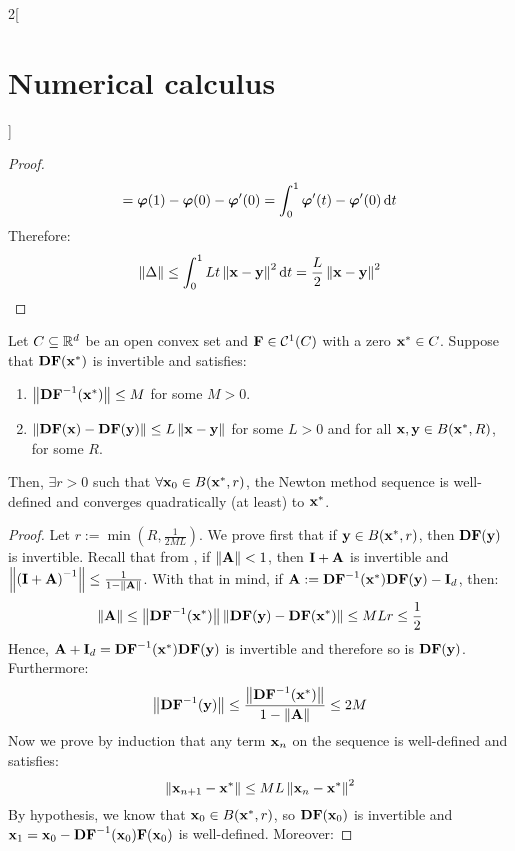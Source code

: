 \documentclass[../../../main_math.tex]{subfiles}
\begin{document}
\begin{multicols}{2}[\section{Numerical calculus}]
\begin{proof}
\begin{multline*}
      =\vf\varphi(1)-\vf\varphi(0)-\vf\varphi'(0)=\int_0^1\vf\varphi'(t)-\vf\varphi'(0)\dd{t}
    \end{multline*}
    Therefore:
    $$\norm{\Delta}\leq \int_0^1Lt \norm{\vf{x}-\vf{y}}^2\dd{t}=\frac{L}{2}\norm{\vf{x}-\vf{y}}^2
    $$
  \end{proof}
  \begin{theorem}
    Let $C\subseteq \RR^d$ be an open convex set and $\vf{F}\in\mathcal{C}^1(C)$ with a zero $\vf{x}^*\in C$. Suppose that $\vf{DF}(\vf{x}^*)$ is invertible and satisfies:
    \begin{enumerate}
      \item $\norm{{\vf{DF}}^{-1}(\vf{x}^*)}\leq M$ for some $M>0$.
      \item $\norm{\vf{DF}(\vf{x}) - \vf{DF}(\vf{y})}\leq L\norm{\vf{x}-\vf{y}}$ for some $L>0$ and for all $\vf{x},\vf{y}\in B(\vf{x}^*,R)$, for some $R$.
    \end{enumerate}
    Then, $\exists r>0$ such that $\forall \vf{x}_0\in B(\vf{x}^*,r)$, the Newton method sequence is well-defined and converges quadratically (at least) to $\vf{x}^*$.
  \end{theorem}
  \begin{proof}
    Let $r:=\min\left(R,\frac{1}{2ML}\right)$. We prove first that if $\vf{y}\in B(\vf{x}^*,r)$, then $\vf{DF}(\vf{y})$ is invertible. Recall that from , if $\norm{\vf{A}}<1$, then $\vf{I}+\vf{A}$ is invertible and $\norm{{(\vf{I}+\vf{A})}^{-1}}\leq\frac{1}{1-\norm{\vf{A}}}$. With that in mind, if $\vf{A}:={\vf{DF}}^{-1}(\vf{x}^*)\vf{DF}(\vf{y}) -\vf{I}_d$, then:
    \begin{equation*}
      \norm{\vf{A}}\leq\norm{{\vf{DF}}^{-1}(\vf{x}^*)}\norm{\vf{DF}(\vf{y})-\vf{DF}(\vf{x}^*)}\leq MLr\leq\frac{1}{2}
    \end{equation*}
    Hence, $\vf{A}+\vf{I}_d={\vf{DF}}^{-1}(\vf{x}^*)\vf{DF}(\vf{y})$ is invertible and therefore so is $\vf{DF}(\vf{y})$. Furthermore:
    \begin{equation}\label{NC:insideNew}
      \norm{{\vf{DF}}^{-1}(\vf{y})} \leq \frac{\norm{{\vf{DF}}^{-1}(\vf{x}^*)}}{1 - \norm{\vf{A}}}\leq  2M
    \end{equation}
    Now we prove by induction that any term $\vf{x}_n$ on the sequence is well-defined and satisfies:
    $$
      \norm{\vf{x}_{n+1}-\vf{x}^*}\leq ML\norm{\vf{x}_n-\vf{x}^*}^2
    $$
    By hypothesis, we know that $\vf{x}_0\in B(\vf{x}^*,r)$, so $\vf{DF}(\vf{x}_0)$ is invertible and $\vf{x}_1=\vf{x}_0-\vf{DF}^{-1}(\vf{x}_0)\vf{F}(\vf{x}_0)$ is well-defined. Moreover:

\end{proof}
\end{multicols}
\end{document}
